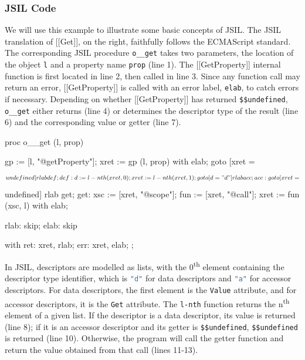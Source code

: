 \documentclass[a4paper,11pt,twoside]{report}
\def\jsinline{\lstinline[language=JavaScript, basicstyle=\small]}
\def\jsilinline{\lstinline[language=JSIL, basicstyle=\small]}
\begin{document}
\subsubsection{JSIL Code}

\begin{minipage}{0.55\textwidth}
We will use this example to illustrate some basic concepts of JSIL. The JSIL translation of [[Get]], on the right, faithfully follows the ECMAScript standard. The corresponding JSIL procedure \jsilinline|o__get| takes two parameters, the location of the object \jsilinline|l| and a property name \jsilinline|prop| (line 1). The [[GetProperty]] internal function is first located in line 2, then called in line 3. Since any function call may return an error, [[GetProperty]] is called with an error label, \jsilinline|elab|, to catch errors if necessary. Depending on whether [[GetProperty]] has returned \jsilinline|$$undefined|, \jsilinline|o__get| either returns (line 4) or determines the descriptor type of the result (line 6) and the corresponding value or getter (line 7).
\end{minipage} \qquad
\begin{minipage}{0.45\textwidth}
\begin{lstjsil}
proc o__get (l, prop) {
				gp := [l, "@getProperty"];
				xret := gp (l, prop) with elab;	
				goto [xret = $$undefined] rlab def;
			
	def:	d := l-nth (xret, 0);
				xret := l-nth (xret, 1);
				goto [d = "d"] rlab acc;
			
	acc:	goto [xret = $$undefined] rlab get;
	get:	xsc := [xret, "@scope"];
				fun := [xret, "@call"];
				xret := fun (xsc, l) with elab;
			
	rlab:	skip;
	elab:	skip
}
with
{
    ret: xret, rlab;
    err: xret, elab;
};
\end{lstjsil}
\end{minipage}

\noindent  In JSIL, descriptors are modelled as lists, with the 0\textsuperscript{th} element containing the descriptor type identifier, which is \jsinline|"d"| for data descriptors and \jsinline|"a"| for accessor descriptors. For data descriptors, the first element is the \jsinline|Value| attribute, and for accessor descriptors, it is the \jsinline|Get| attribute. The \jsilinline|l-nth| function returns the n\textsuperscript{th} element of a given list. If the descriptor is a data descriptor, its value is returned (line 8); if it is an accessor descriptor and its getter is \jsilinline|$$undefined|, \jsinline|$$undefined| is returned (line 10). Otherwise, the program will call the getter function and return the value obtained from that call (lines 11-13).
\end{document}
